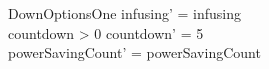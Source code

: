 \begin{schema}{DownOptionsOne}
	infusing' = infusing\\
	countdown > 0 \land countdown' = 5\\
	powerSavingCount' = powerSavingCount\\ 
\end{schema}


